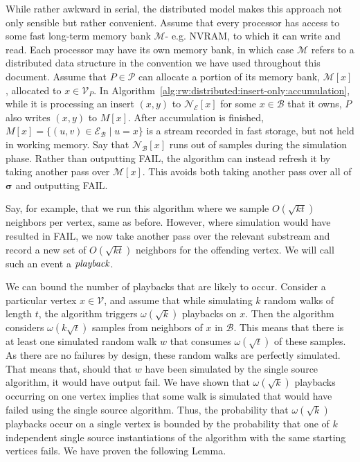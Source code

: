 \documentclass{report}
\begin{document}
While rather awkward in serial, the distributed model makes this approach not only sensible but rather convenient. 
Assume that every processor has access to some fast long-term memory bank $\mathcal{M}$- e.g. NVRAM, to which it can write and read.
Each processor may have its own memory bank, in which case $\mathcal{M}$ refers to a distributed data structure in the convention we have used throughout this document.
Assume that $P \in \mathcal{P}$ can allocate a portion of its memory bank, $\mathcal{M}[x]$, allocated to $x \in \mathcal{V}_P$.
In Algorithm~\ref{alg:rw:distributed:insert-only:accumulation}, while it is processing an insert $(x, y)$ to $\mathcal{N}_\mathcal{E}[x]$ for some $x \in \mathcal{B}$ that it owns, $P$ also writes $(x,y)$ to $M[x]$.
After accumulation is finished, $M[x] = \{ (u, v) \in \mathcal{E}_\mathcal{B} \mid u = x\}$ is a stream recorded in fast storage, but not held in working memory.
Say that $\mathcal{N}_\mathcal{B}[x]$ runs out of samples during the simulation phase. 
Rather than outputting FAIL, the algorithm can instead refresh it by taking another pass over $\mathcal{M}[x]$.
This avoids both taking another pass over all of $\boldsymbol{\sigma}$ and outputting FAIL.

Say, for example, that we run this algorithm where we sample $O(\sqrt{kt})$ neighbors per vertex, same as before.
However, where simulation would have resulted in FAIL, we now take another pass over the relevant substream and record a new set of $O(\sqrt{kt})$ neighbors for the offending vertex.
We will call such an event a $\emph{playback}$.

We can bound the number of playbacks that are likely to occur.
Consider a particular vertex $x \in \mathcal{V}$, and assume that while simulating $k$ random walks of length $t$, the algorithm triggers $\omega(\sqrt{k})$ playbacks on $x$.
Then the algorithm considers $\omega(k\sqrt{t})$ samples from neighbors of $x$ in $\mathcal{B}$. 
This means that there is at least one simulated random walk $w$ that consumes $\omega(\sqrt{t})$ of these samples.
As there are no failures by design, these random walks are perfectly simulated.
That means that, should that $w$ have been simulated by the single source algorithm, it would have output fail. 
We have shown that $\omega(\sqrt{k})$ playbacks occurring on one vertex implies that some walk is simulated that would have failed using the single source algorithm. 
Thus, the probability that $\omega(\sqrt{k})$ playbacks occur on a single vertex is bounded by the probability that one of $k$ independent single source instantiations of the algorithm with the same starting vertices fails. 
We have proven the following Lemma.
\end{document}
